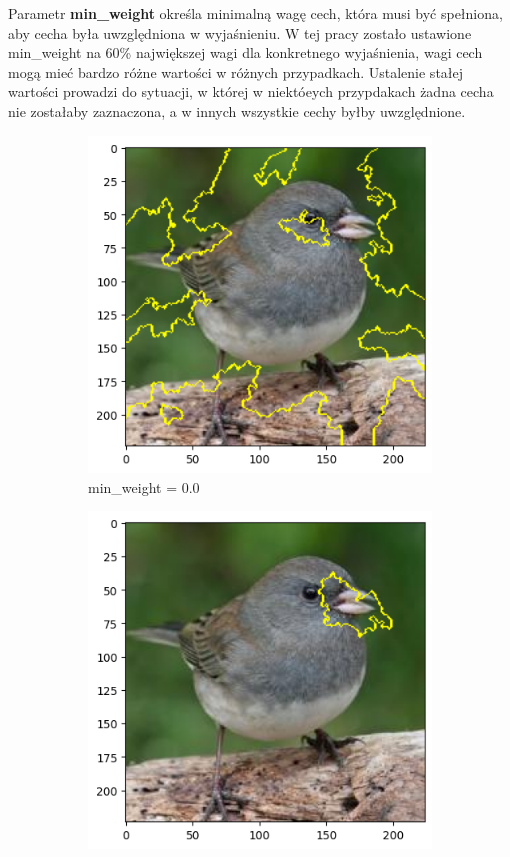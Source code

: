 Parametr \textbf{min\_weight} określa minimalną wagę cech, która musi być spełniona, aby cecha była uwzględniona w wyjaśnieniu.
W tej pracy zostało ustawione min\_weight na 60\% największej wagi dla konkretnego wyjaśnienia, wagi cech mogą mieć bardzo różne wartości w różnych przypadkach.
Ustalenie stałej wartości prowadzi do sytuacji, w której w niektóeych przypdakach żadna cecha nie zostałaby zaznaczona, a w innych wszystkie cechy byłby uwzględnione.

\begin{figure}[h]
	\centering
	\begin{subfigure}[b]{0.3\textwidth}
		\includegraphics[width=.9\textwidth]{img/parameters/lime/min_weight_00}
		\caption{min\_weight = 0.0}  \label{rys:parameters_lime_numsamples_5}
	\end{subfigure}
	\begin{subfigure}[b]{0.3\textwidth}
		\centering\includegraphics[width=.9\textwidth]{img/parameters/lime/min_weight_03}

\end{subfigure}
\end{figure}

